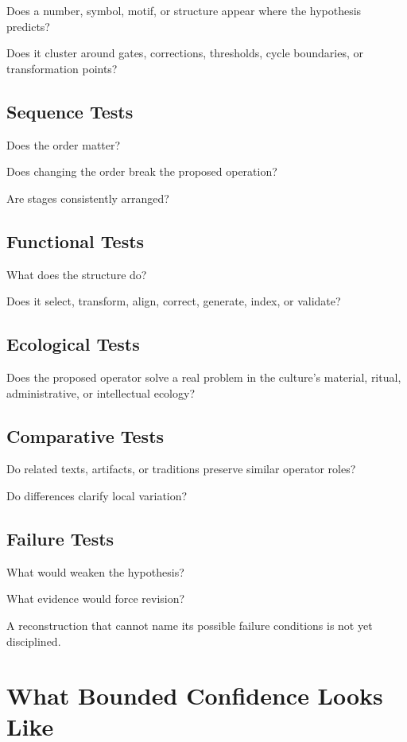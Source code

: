 \documentclass[11pt]{book}
\begin{document}
Does a number, symbol, motif, or structure appear where the hypothesis predicts?

Does it cluster around gates, corrections, thresholds, cycle boundaries, or transformation points?

\subsection{Sequence Tests}

Does the order matter?

Does changing the order break the proposed operation?

Are stages consistently arranged?

\subsection{Functional Tests}

What does the structure do?

Does it select, transform, align, correct, generate, index, or validate?

\subsection{Ecological Tests}

Does the proposed operator solve a real problem in the culture's material, ritual, administrative, or intellectual ecology?

\subsection{Comparative Tests}

Do related texts, artifacts, or traditions preserve similar operator roles?

Do differences clarify local variation?

\subsection{Failure Tests}

What would weaken the hypothesis?

What evidence would force revision?

A reconstruction that cannot name its possible failure conditions is not yet disciplined.

\section{What Bounded Confidence Looks Like}
\end{document}
